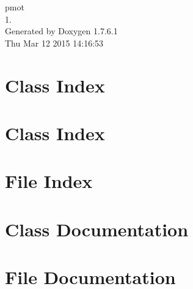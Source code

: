 \documentclass[a4paper]{book}
\begin{document}
\hypersetup{pageanchor=false,citecolor=blue}
\begin{titlepage}
\vspace*{7cm}
\begin{center}
{\Large pmot \\[1ex]\large 1. }\\
\vspace*{1cm}
{\large \-Generated by Doxygen 1.7.6.1}\\
\vspace*{0.5cm}
{\small Thu Mar 12 2015 14:16:53}\\
\end{center}
\end{titlepage}
\clearemptydoublepage
{}
\tableofcontents
\clearemptydoublepage
{}
\hypersetup{pageanchor=true,citecolor=blue}
\chapter{\-Class \-Index}

\chapter{\-Class \-Index}

\chapter{\-File \-Index}

\chapter{\-Class \-Documentation}





























\chapter{\-File \-Documentation}



























\printindex
\end{document}
